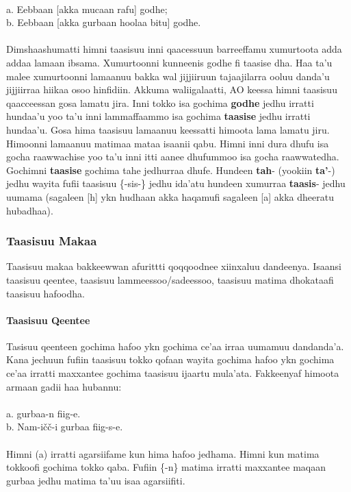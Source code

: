 \documentclass[11pt,b5paper]{book}
\begin{document}
\\
a. Eebbaan [akka mucaan rafu] godhe; \\
b. Eebbaan [akka gurbaan hoolaa bitu] godhe.\\
\\
Dimshaashumatti himni taasisuu inni qaacessuun barreeffamu xumurtoota adda addaa lamaan ibsama. Xumurtoonni kunneenis godhe fi taasise dha. Haa ta’u malee xumurtoonni lamaanuu bakka wal jijjiiruun tajaajilarra ooluu danda’u jijjiirraa hiikaa osoo hinfidiin. Akkuma waliigalaatti, AO keessa
himni taasisuu qaacceessan gosa lamatu jira. Inni tokko isa gochima \textbf{godhe} jedhu irratti hundaa’u yoo ta’u inni lammaffaammo isa gochima \textbf{taasise} jedhu irratti hundaa’u.
Gosa hima taasisuu lamaanuu keessatti himoota lama lamatu jiru. Himoonni lamaanuu matimaa mataa isaanii qabu. Himni inni dura dhufu isa gocha raawwachise yoo ta’u inni itti aanee dhufummoo isa gocha raawwatedha. Gochimni \textbf{taasise} gochima tahe jedhurraa dhufe. Hundeen \textbf{tah}- (yookiin \textbf{ta’}-) jedhu wayita fufii taasisuu \{-sis-\} jedhu ida’atu hundeen xumurraa \textbf{taasis}- jedhu uumama (sagaleen [h] ykn hudhaan akka haqamufi sagaleen [a] akka dheeratu hubadhaa). 

\subsubsection{Taasisuu Makaa}
Taasisuu makaa bakkeewwan afurittti qoqqoodnee xiinxaluu dandeenya. Isaansi taasisuu qeentee, taasisuu lammeessoo/sadeessoo, taasisuu matima dhokataafi taasisuu hafoodha. 

\paragraph{Taasisuu Qeentee}

Tasisuu qeenteen gochima hafoo ykn gochima ce’aa irraa uumamuu dandanda’a. Kana jechuun fufiin taasisuu tokko qofaan wayita gochima hafoo ykn gochima ce’aa irratti maxxantee gochima taasisuu ijaartu mula’ata. Fakkeenyaf himoota armaan gadii haa hubannu:\\
\\
a. gurbaa-n fiig-e.\\
b. Nam-ičč-i gurbaa fiig-s-e.\\
\\
Himni (a) irratti agarsiifame kun hima hafoo jedhama. Himni kun matima tokkoofi gochima tokko qaba. Fufiin \{-n\} matima irratti maxxantee maqaan gurbaa jedhu matima ta’uu isaa agarsiifiti. 
\end{document}
